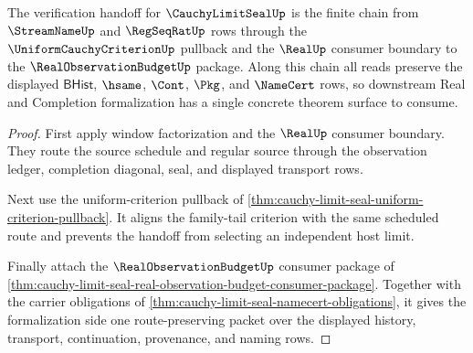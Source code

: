 \begin{theorem}
\label{thm:cauchy-limit-seal-verification-handoff}
The verification handoff for $\CauchyLimitSealUp$ is the finite chain from $\StreamNameUp$ and $\RegSeqRatUp$ rows through the $\UniformCauchyCriterionUp$ pullback and the $\RealUp$ consumer boundary to the $\RealObservationBudgetUp$ package. Along this chain all reads preserve the displayed $\mathsf{BHist}$, $\hsame$, $\Cont$, $\Pkg$, and $\NameCert$ rows, so downstream Real and Completion formalization has a single concrete theorem surface to consume.
\end{theorem}
\begin{proof}
First apply window factorization and the $\RealUp$ consumer boundary. They route the source schedule and regular source through the observation ledger, completion diagonal, seal, and displayed transport rows.

Next use the uniform-criterion pullback of \autoref{thm:cauchy-limit-seal-uniform-criterion-pullback}. It aligns the family-tail criterion with the same scheduled route and prevents the handoff from selecting an independent host limit.

Finally attach the $\RealObservationBudgetUp$ consumer package of \autoref{thm:cauchy-limit-seal-real-observation-budget-consumer-package}. Together with the carrier obligations of \autoref{thm:cauchy-limit-seal-namecert-obligations}, it gives the formalization side one route-preserving packet over the displayed history, transport, continuation, provenance, and naming rows.
\end{proof}

